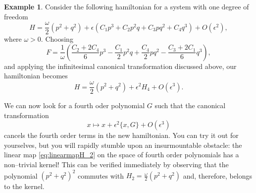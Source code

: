 \documentclass[english,fontsize=11pt,paper=b5]{scrbook}
\numberwithin{equation}{chapter}
\theoremstyle{definition}
\newtheorem{example}{Example}[chapter]
\begin{document}
      \begin{example}
        Consider the following hamiltonian for a system with one degree of freedom
        \begin{equation}
          H = \frac\omega2 (p^2 + q^2) + \epsilon(C_1 p^3 + C_2 p^2 q + C_3 p q^2 + C_4 q^3) + O(\epsilon^2),
        \end{equation}
        where $\omega >0$.
        Choosing
        \begin{equation}
          F = \frac{1}{\omega}\left(
            \frac{C_2 + 2 C_4}{6} p^3
            - \frac {C_1}2 p^2 q
            + \frac{C_4}{2} p q^2
            -\frac{C_3 + 2 C_1}{6} q^3
          \right),
        \end{equation}
        and applying the infinitesimal canonical transformation discussed above, our hamiltonian becomes
        \begin{equation}
          H = \frac{\omega}{2}(p^2 + q^2) + \epsilon^2 H_4 + O(\epsilon^3).
        \end{equation}

        We can now look for a fourth oder polynomial $G$ such that the canonical transformation
        \begin{equation}
          x \mapsto x + \epsilon^2 \big\{x, G\big\} + O(\epsilon^3)
        \end{equation}
        cancels the fourth order terms in the new hamiltonian.
        You can try it out for yourselves, but you will rapidly stumble upon an insurmountable obstacle: the linear map \eqref{eq:linearmapH_2} on the space of fourth order polynomials has a non--trivial kernel! This can be verified immediately by observing that the polynomial $(p^2+q^2)^2$ commutes with $H_2=\frac\omega2(p^2+q^2)$ and, therefore, belongs to the kernel.
      \end{example}
\end{document}
